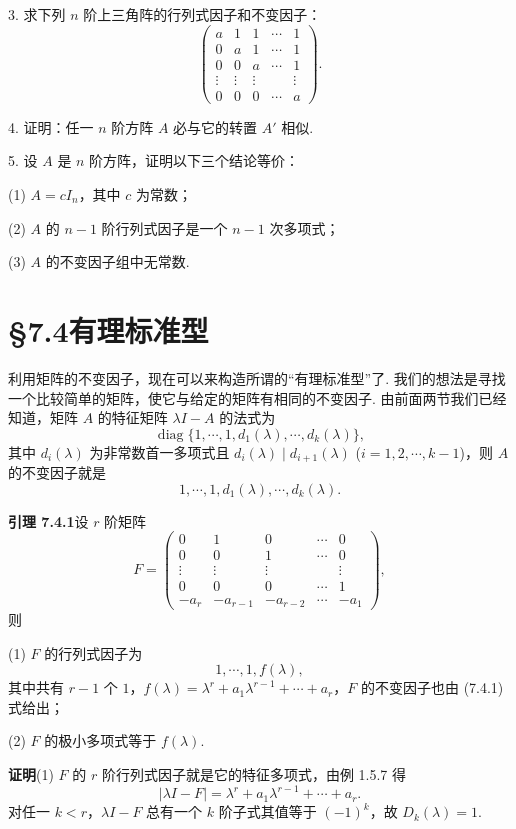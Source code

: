 \documentclass[UTF8,12pt,a4paper,fontset=fandol]{ctexart}
\begin{document}
3. 求下列 $n$ 阶上三角阵的行列式因子和不变因子：
\[
\left(\begin{array}{ccccc}
a & 1 & 1 & \cdots & 1\\
0 & a & 1 & \cdots & 1\\
0 & 0 & a & \cdots & 1\\
\vdots & \vdots & \vdots & & \vdots\\
0 & 0 & 0 & \cdots & a
\end{array}\right).
\]

4. 证明：任一 $n$ 阶方阵 $A$ 必与它的转置 $A'$ 相似.

5. 设 $A$ 是 $n$ 阶方阵，证明以下三个结论等价：

(1) $A=cI_n$，其中 $c$ 为常数；

(2) $A$ 的 $n-1$ 阶行列式因子是一个 $n-1$ 次多项式；

(3) $A$ 的不变因子组中无常数.

\section*{§7.4\quad 有理标准型}

利用矩阵的不变因子，现在可以来构造所谓的“有理标准型”了. 我们的想法是寻找一个比较简单的矩阵，使它与给定的矩阵有相同的不变因子. 由前面两节我们已经知道，矩阵 $A$ 的特征矩阵 $\lambda I-A$ 的法式为
\[
\operatorname{diag}\{1,\cdots,1,d_1(\lambda),\cdots,d_k(\lambda)\},
\]
其中 $d_i(\lambda)$ 为非常数首一多项式且 $d_i(\lambda)\mid d_{i+1}(\lambda)$ ($i=1,2,\cdots,k-1$)，则 $A$ 的不变因子就是
\[
1,\cdots,1,d_1(\lambda),\cdots,d_k(\lambda).
\]

\noindent\textbf{引理 7.4.1}\quad 设 $r$ 阶矩阵
\[
F=\left(\begin{array}{ccccc}
0 & 1 & 0 & \cdots & 0\\
0 & 0 & 1 & \cdots & 0\\
\vdots & \vdots & \vdots & & \vdots\\
0 & 0 & 0 & \cdots & 1\\
-a_r & -a_{r-1} & -a_{r-2} & \cdots & -a_1
\end{array}\right),
\]
则

(1) $F$ 的行列式因子为
\begin{equation}
1,\cdots,1,f(\lambda),
\tag{7.4.1}
\end{equation}
其中共有 $r-1$ 个 $1$，$f(\lambda)=\lambda^r+a_1\lambda^{r-1}+\cdots+a_r$，$F$ 的不变因子也由 (7.4.1) 式给出；

(2) $F$ 的极小多项式等于 $f(\lambda)$.

\noindent\textbf{证明}\quad (1) $F$ 的 $r$ 阶行列式因子就是它的特征多项式，由例 1.5.7 得
\[
|\lambda I-F|=\lambda^r+a_1\lambda^{r-1}+\cdots+a_r.
\]
对任一 $k<r$，$\lambda I-F$ 总有一个 $k$ 阶子式其值等于 $(-1)^k$，故 $D_k(\lambda)=1$.
\end{document}
